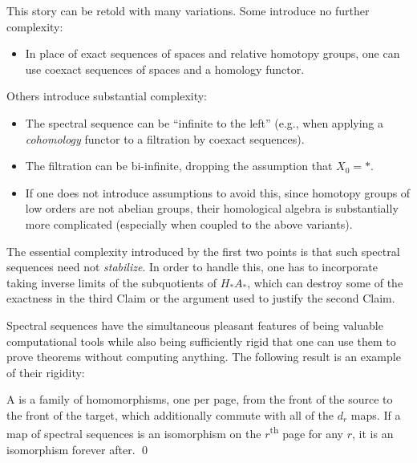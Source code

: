 \begin{remark}
This story can be retold with many variations.
Some introduce no further complexity:
\begin{itemize}
    \item In place of exact sequences of spaces and relative homotopy groups, one can use coexact sequences of spaces and a homology functor.
\end{itemize}
Others introduce substantial complexity:
\begin{itemize}
    \item The spectral sequence can be ``infinite to the left'' (e.g., when applying a \emph{cohomology} functor to a filtration by coexact sequences).
    \item The filtration can be bi-infinite, dropping the assumption that $X_0 = *$.
    \item If one does not introduce assumptions to avoid this, since homotopy groups of low orders are not abelian groups, their homological algebra is substantially more complicated (especially when coupled to the above variants).
\end{itemize}
The essential complexity introduced by the first two points is that such spectral sequences need not \emph{stabilize}.
In order to handle this, one has to incorporate taking inverse limits of the subquotients of $H_* A_*$, which can destroy some of the exactness in the third Claim or the argument used to justify the second Claim.
\end{remark}

Spectral sequences have the simultaneous pleasant features of being valuable computational tools while also being sufficiently rigid that one can use them to prove theorems without computing anything.
The following result is an example of their rigidity:

\begin{lemma}
A  is a family of homomorphisms, one per page, from the front of the source to the front of the target, which additionally commute with all of the $d_r$ maps.
If a map of spectral sequences is an isomorphism on the $r$\textsuperscript{th} page for any $r$, it is an isomorphism forever after. \qed
\end{lemma}

